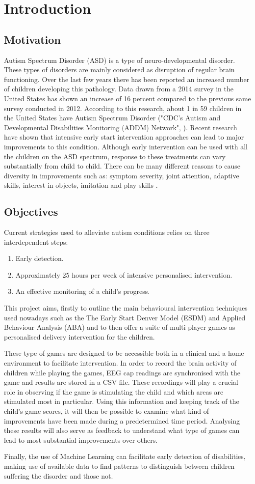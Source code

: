 \chapter{Introduction}
\section{Motivation}
Autism Spectrum Disorder (ASD) is a type of neuro-developmental disorder. These types of disorders are mainly considered as disruption of regular brain functioning. Over the last few years there has been reported an increased number of children developing this pathology. Data drawn from a 2014 survey in the United States has shown an increase of 16 percent compared to the previous same survey conducted in 2012. According to this research, about 1 in 59 children in the United States have Autism Spectrum Disorder ("CDC's Autism and Developmental Disabilities Monitoring (ADDM) Network", \cite{first}). Recent research have shown that intensive early start intervention approaches can lead to major improvements to this condition. Although early intervention can be used with all the children on the ASD spectrum, response to these treatments can vary substantially from child to child. There can be many different reasons to cause diversity in improvements such as: symptom severity, joint attention, adaptive skills, interest in objects, imitation and play skills \cite{paper1}. 
\section{Objectives}
Current strategies used to alleviate autism conditions relies on three interdependent steps: 
\begin{enumerate} 
\itemsep0em
\item Early detection.
\item Approximately 25 hours per week of intensive personalised intervention. 
\item An effective monitoring of a child's progress.
\end{enumerate}
This project aims, firstly to outline the main behavioural intervention techniques used nowadays such as the The Early Start Denver Model (ESDM) and Applied Behaviour Analysis (ABA) and to then offer a suite of multi-player games as personalised delivery intervention for the children. 

These type of games are designed to be accessible both in a clinical and a home environment to facilitate intervention. In order to record the brain activity of children while playing the games, EEG cap readings are synchronised with the game and results are stored in a CSV file. These recordings will play a crucial role in observing if the game is stimulating the child and which areas are stimulated most in particular. Using this information and keeping track of the child's game scores, it will then be possible to examine what kind of improvements have been made during a predetermined time period. Analysing these results will also serve as feedback to understand what type of games can lead to most substantial improvements over others. 

Finally, the use of Machine Learning can facilitate early detection of disabilities, making use of available data to find patterns to distinguish between children suffering the disorder and those not.